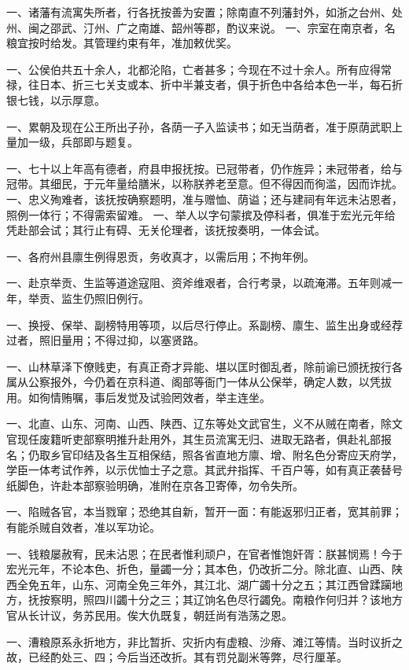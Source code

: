 \documentclass[]{article}
\begin{document}
一、诸藩有流寓失所者，行各抚按善为安置；除南直不列藩封外，如浙之台州、处州、闽之邵武、汀州、广之南雄、韶州等郡，酌议来说。
一、宗室在南京者，名粮宜按时给发。其管理约束有年，准加敕优奖。

一、公侯伯共五十余人，北都沦陷，亡者甚多；今现在不过十余人。所有应得常禄，往日本、折三七关支或本、折中半兼支者，俱于折色中各给本色一半，每石折银七钱，以示厚意。

一、累朝及现在公王所出子孙，各荫一子入监读书；如无当荫者，准于原荫武职上量加一级，兵部即与题复。

一、七十以上年高有德者，府县申报抚按。已冠带者，仍作旌异；未冠带者，给与冠带。其细民，于元年量给膳米，以称朕养老至意。但不得因而徇滥，因而诈扰。
一、忠义殉难者，该抚按确察题明，准与赠恤、荫谥；还与建祠有年远未沾恩者，照例一体行；不得需索留难。
一、举人以字句蒙摈及停科者，俱准于宏光元年给凭赴部会试；其行止有碍、无关伦理者，该抚按奏明，一体会试。

一、各府州县廪生例得恩贡，务收真才，以需后用；不拘年例。

一、赴京举贡、生监等道途寇阻、资斧维艰者，合行考录，以疏淹滞。五年则减一年，举贡、监生仍照旧例行。

一、换授、保举、副榜特用等项，以后尽行停止。系副榜、廪生、监生出身或经荐过者，照旧量用；不得过抑，以塞贤路。

一、山林草泽下僚贱吏，有真正奇才异能、堪以匡时御乱者，除前谕已颁抚按行各属从公察报外，今仍着在京科道、阁部等衙门一体从公保举，确定人数，以凭拔用。如徇情贿嘱，事后发觉及试验罔效者，举主连坐。

一、北直、山东、河南、山西、陕西、辽东等处文武官生，义不从贼在南者，除文官现任废籍听吏部察明推升赴用外，其生员流寓无归、进取无路者，俱赴礼部报名；仍取乡官印结及各生互相保结，照各省直地方廪、增、附名色分寄应天府学，学臣一体考试作养，以示优恤士子之意。其武弁指挥、千百户等，如有真正袭替号纸脚色，许赴本部察验明确，准附在京各卫寄俸，勿令失所。

一、陷贼各官，本当戮窜；恐绝其自新，暂开一面：有能返邪归正者，宽其前罪；有能杀贼自效者，准以军功论。

一、钱粮屡赦宥，民未沾恩；在民者惟利顽户，在官者惟饱奸胥：朕甚悯焉！今于宏光元年，不论本色、折色，量蠲一分；其本色，仍改折二分。除北直、山西、陕西全免五年，山东、河南全免三年外，其江北、湖广蠲十分之五；其江西曾蹂躏地方，抚按察明，照四川蠲十分之三；其辽饷名色尽行蠲免。南粮作何归并？该地方官从长计议，务苏民用。俟大仇既复，朝廷尚有浩荡之恩。

一、漕粮原系永折地方，非比暂折、灾折内有虚粮、沙瘠、滩江等情。当时议折之故，已经酌处三、四；今后当还改折。其有罚兑副米等弊，尽行厘革。
\end{document}
